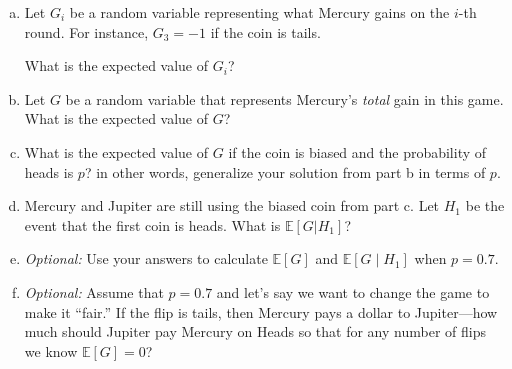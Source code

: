 \documentclass[12pt,letterpaper]{article}
\newenvironment{22enumerate}{\begin{enumerate}[a.]\itemsep0em}{\end{enumerate}}
\newif\ifsol
\newcommand{\solu}[2]{ \begin{mdframed} \ifsol #2 \else \vspace{#1} \fi \end{mdframed} }
\begin{document}
\begin{22enumerate}
    \item Let $G_i$ be a random variable representing what Mercury gains on the $i$-th round. For instance, $G_3=-1$ if the coin is tails.
    
    What is the expected value of $G_i$?
    \solu{1cm}{Since $\Pr(G_i=1) = \frac{1}{2}$ and $\Pr(G_i=-1) = \frac{1}{2}$, $\mathbb{E}[G_i]=\frac12 - \frac12 = 0$.}

    \item Let $G$ be a random variable that represents Mercury's \textit{total} gain in this game. What is the expected value of $G$?
    \solu{1cm}{$\mathbb{E}[G] = \mathbb{E}[G_1] + \mathbb{E}[G_2] + \mathbb{E}[G_3]$, where $G_i$ is the expected gain from flip $i$. We already know that $\mathbb{E}[G_i]=0$, so $\mathbb{E}[G] = 0 + 0 + 0 = 0$ as well.}
    
    \item What is the expected value of $G$ if the coin is biased and the probability of heads is $p$? in other words, generalize your solution from part b in terms of $p$.
    \solu{1cm}{Now, $\mathbb{E}[G_i] = p \cdot 1 + (1 - p) \cdot (-1) = p - 1 + p = 2p - 1$. 
    Thus, $\mathbb{E}[G] = \mathbb{E}[G_1] + \mathbb{E}[G_2] + \mathbb{E}[G_3] = (2p - 1) + (2p - 1) + (2p - 1) = 6p - 3$.}
    
    \item Mercury and Jupiter are still using the biased coin from part c. Let $H_1$ be the event that the first coin is heads. What is $\mathbb{E}[G| H_1]$?
    \solu{1cm}{$\mathbb{E}[G\mid H_1] = 1 + (2p - 1) + (2p - 1) = 4p - 1$.
    
    $G_1$ is 1 from the first round guaranteed, and the other terms are from part c.}
    
    \item \textit{Optional:} Use your answers to calculate $\mathbb{E}[G]$ and $\mathbb{E}[G\mid H_1]$ when $p = 0.7$.
    \solu{1cm}{$\mathbb{E}[G] = 6p - 3 = 6 \cdot 0.7 - 3 = 1.2$
    
    $\mathbb{E}[G\mid H_1] = 4p - 1 = 4 \cdot 0.7 - 1 = 1.8$}
    \item \textit{Optional:} Assume that $p = 0.7$ and let's say we want to change the game to make it ``fair.'' If the flip is tails, then Mercury pays a dollar to Jupiter---how much should Jupiter pay Mercury on Heads so that for any number of flips we know $\mathbb{E}[G]=0$?
    \solu{1cm}{Each $\mathbb{E}[G_i]$ is $0.3 \cdot (-1) + 0.7 \cdot x$, where $x$ is the number of dollars that Jupiter should pay Mercury on Heads. Thus, we have $\mathbb{E}[G] = (0.3 \cdot (-1) + 0.7 \cdot x) \cdot 3 = 0$. Solving for $x$, we have $x = \frac{3}{7}$. So, Jupiter should pay Mercury $\$0.43$ on heads so that the game is fair.}
    
\end{22enumerate}
\end{document}
